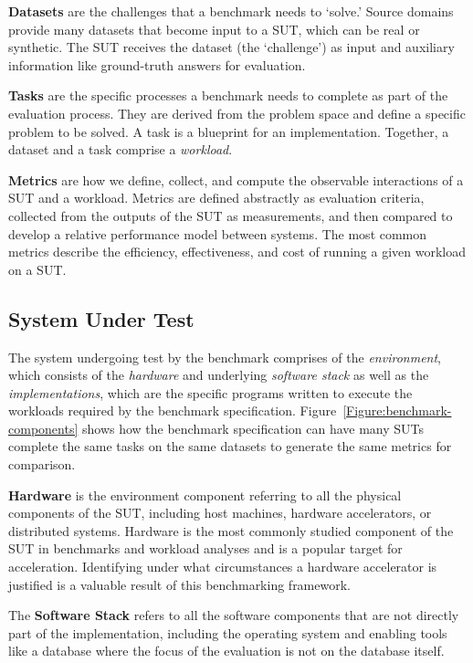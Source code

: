 \textbf{Datasets}
are the challenges that a benchmark needs to `solve.'
Source domains provide many datasets that become input to a \ac{SUT}, which can be real or synthetic. 
The \ac{SUT} receives the dataset (the `challenge') as input and auxiliary information like ground-truth answers for evaluation.

\textbf{Tasks}
are the specific processes a benchmark needs to complete as part of the evaluation process.
They are derived from the problem space and define a specific problem to be solved. 
A task is a blueprint for an implementation.
Together, a dataset and a task comprise a \textit{workload}.

\textbf{Metrics}
are how we define, collect, and compute the observable interactions of a SUT and a workload. 
Metrics are defined abstractly as evaluation criteria, collected from the outputs of the SUT as measurements, and then compared to develop a relative performance model between systems. 
The most common metrics describe the efficiency, effectiveness, and cost of running a given workload on a \ac{SUT}.

\subsection{System Under Test}
The system undergoing test by the benchmark comprises of the \textit{environment}, which consists of the \textit{hardware} and underlying \textit{software stack} as well as the \textit{implementations}, which are the specific programs written to execute the workloads required by the benchmark specification. 
Figure~\ref{Figure:benchmark-components} shows how the benchmark specification can have many \ac{SUT}s complete the same tasks on the same datasets to generate the same metrics for comparison.

\textbf{Hardware}  
is the environment component referring to all the physical components of the \ac{SUT}, including host machines, hardware accelerators, or distributed systems.  
Hardware is the most commonly studied component of the \ac{SUT} in benchmarks and workload analyses and is a popular target for acceleration.
Identifying under what circumstances a hardware accelerator is justified is a valuable result of this benchmarking framework.  

The \textbf{Software Stack}
refers to all the software components that are not directly part of the implementation, including the operating system and enabling tools like a database where the focus of the evaluation is not on the database itself.

